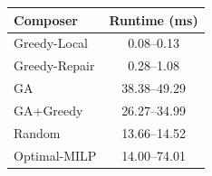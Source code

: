 \begin{tabular}{lc}
\toprule
Composer & Runtime (ms) \\
\midrule
Greedy-Local & 0.08--0.13 \\
Greedy-Repair & 0.28--1.08 \\
GA & 38.38--49.29 \\
GA+Greedy & 26.27--34.99 \\
Random & 13.66--14.52 \\
Optimal-MILP & 14.00--74.01 \\
\bottomrule
\end{tabular}
